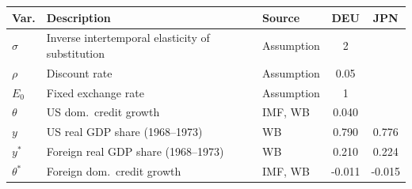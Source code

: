 \begin{tabular}{l l l c c}
\toprule
Var. & Description & Source & DEU & JPN \\
\midrule
\(\sigma\) & Inverse intertemporal elasticity of substitution & Assumption & 2 & \\
\(\rho\) & Discount rate & Assumption & 0.05 & \\
\(E_0\) & Fixed exchange rate & Assumption & 1 & \\
\(\theta\) & US dom.\ credit growth & IMF, WB & 0.040 & \\
\midrule
\(y\) & US real GDP share (1968--1973) & WB & 0.790 & 0.776 \\
\(y^{*}\) & Foreign real GDP share (1968--1973) & WB & 0.210 & 0.224 \\
\(\theta^{*}\) & Foreign dom.\ credit growth & IMF, WB & -0.011 & -0.015 \\
\bottomrule
\end{tabular}
